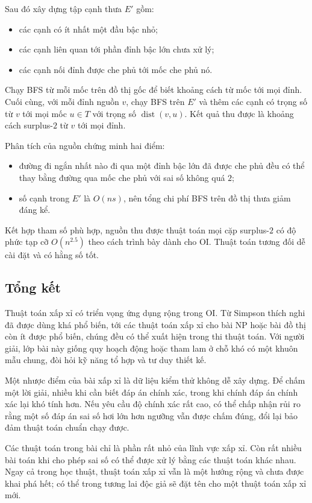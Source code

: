 \documentclass[11pt]{article}
\begin{document}
Sau đó xây dựng tập cạnh thưa $E'$ gồm:
\begin{itemize}
  \item các cạnh có ít nhất một đầu bậc nhỏ;
  \item các cạnh liên quan tới phần đỉnh bậc lớn chưa xử lý;
  \item các cạnh nối đỉnh được che phủ tới mốc che phủ nó.
\end{itemize}
Chạy BFS từ mỗi mốc trên đồ thị gốc để biết khoảng cách từ mốc tới mọi đỉnh.
Cuối cùng, với mỗi đỉnh nguồn $v$, chạy BFS trên $E'$ và thêm các cạnh có trọng
số từ $v$ tới mọi mốc $u\in T$ với trọng số $\operatorname{dist}(v,u)$. Kết quả
thu được là khoảng cách surplus-$2$ từ $v$ tới mọi đỉnh.

Phân tích của nguồn chứng minh hai điểm:
\begin{itemize}
  \item đường đi ngắn nhất nào đi qua một đỉnh bậc lớn đã được che phủ đều có
  thể thay bằng đường qua mốc che phủ với sai số không quá $2$;
  \item số cạnh trong $E'$ là $O(ns)$, nên tổng chi phí BFS trên đồ thị thưa
  giảm đáng kể.
\end{itemize}

Kết hợp tham số phù hợp, nguồn thu được thuật toán mọi cặp surplus-$2$ có độ
phức tạp cỡ $O(n^{2.5})$ theo cách trình bày dành cho OI. Thuật toán tương đối
dễ cài đặt và có hằng số tốt.

\subsection{Tổng kết}

Thuật toán xấp xỉ có triển vọng ứng dụng rộng trong OI. Từ Simpson thích nghi
đã được dùng khá phổ biến, tới các thuật toán xấp xỉ cho bài NP hoặc bài đồ
thị còn ít được phổ biến, chúng đều có thể xuất hiện trong thi thuật toán. Với
người giải, lớp bài này giống quy hoạch động hoặc tham lam ở chỗ khó có một
khuôn mẫu chung, đòi hỏi kỹ năng tổ hợp và tư duy thiết kế.

Một nhược điểm của bài xấp xỉ là dữ liệu kiểm thử không dễ xây dựng. Để chấm
một lời giải, nhiều khi cần biết đáp án chính xác, trong khi chính đáp án chính
xác lại khó tính hơn. Nếu yêu cầu độ chính xác rất cao, có thể chấp nhận rủi ro
rằng một số đáp án sai số hơi lớn hơn ngưỡng vẫn được chấm đúng, đổi lại bảo
đảm thuật toán chuẩn chạy được.

Các thuật toán trong bài chỉ là phần rất nhỏ của lĩnh vực xấp xỉ. Còn rất nhiều
bài toán khi cho phép sai số có thể được xử lý bằng các thuật toán khác nhau.
Ngay cả trong học thuật, thuật toán xấp xỉ vẫn là một hướng rộng và chưa được
khai phá hết; có thể trong tương lai độc giả sẽ đặt tên cho một thuật toán xấp
xỉ mới.
\end{document}

